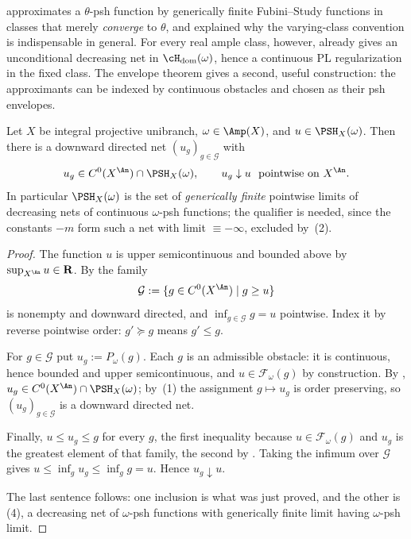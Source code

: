  approximates a $\theta$-psh function by generically
finite Fubini--Study functions in classes that merely \emph{converge} to
$\theta$, and  explained why the varying-class
convention is indispensable in general.  For every real ample class,
however,  already gives an unconditional
decreasing net in $\cH_{\mathrm{dom}}(\omega)$, hence a continuous PL
regularization in the fixed class.  The envelope theorem gives a second,
useful construction: the approximants can be indexed by continuous
obstacles and chosen as their psh envelopes.

\begin{theorem}
\label{thm:ch45-continuous-regularization}
Let $X$ be integral projective unibranch, $\omega\in\Amp(X)$, and
$u\in\PSH_X(\omega)$.  Then there is a downward directed net
$(u_g)_{g\in\mathcal G}$ with
\[
 u_g\in C^0(X^{\An})\cap\PSH_X(\omega),
 \qquad
 u_g\downarrow u\ \text{ pointwise on }X^{\An}.
\]
In particular $\PSH_X(\omega)$ is the set of \emph{generically finite}
pointwise limits of decreasing nets of continuous $\omega$-psh functions;
the qualifier is needed, since the constants $-m$ form such a net with
limit $\equiv-\infty$, excluded by \,(2).
\end{theorem}

\begin{proof}
The function $u$ is upper semicontinuous and bounded above by
$\sup_{X^{\An}}u\in\mathbf R$.  By
 the family
\[
 \mathcal G:=\{g\in C^0(X^{\An})\mid g\ge u\}
\]
is nonempty and downward directed, and $\inf_{g\in\mathcal G}g=u$
pointwise.  Index it by reverse pointwise order:
$g'\succeq g$ means $g'\le g$.

For $g\in\mathcal G$ put $u_g:=P_\omega(g)$.  Each $g$ is an
admissible obstacle: it is continuous, hence bounded and upper
semicontinuous, and $u\in\mathcal F_\omega(g)$ by construction.  By
, $u_g\in
C^0(X^{\An})\cap\PSH_X(\omega)$; by
\,(1) the assignment
$g\mapsto u_g$ is order preserving, so $(u_g)_{g\in\mathcal G}$ is a
downward directed net.

Finally, $u\le u_g\le g$ for every $g$, the first inequality because
$u\in\mathcal F_\omega(g)$ and $u_g$ is the greatest element of that family,
the second by .  Taking the infimum over
$\mathcal G$ gives $u\le\inf_gu_g\le\inf_gg=u$.  Hence $u_g\downarrow
u$.

The last sentence follows: one inclusion is what was just proved, and the
other is \,(4), a decreasing net of
$\omega$-psh functions with generically finite limit having
$\omega$-psh limit.
\end{proof}

